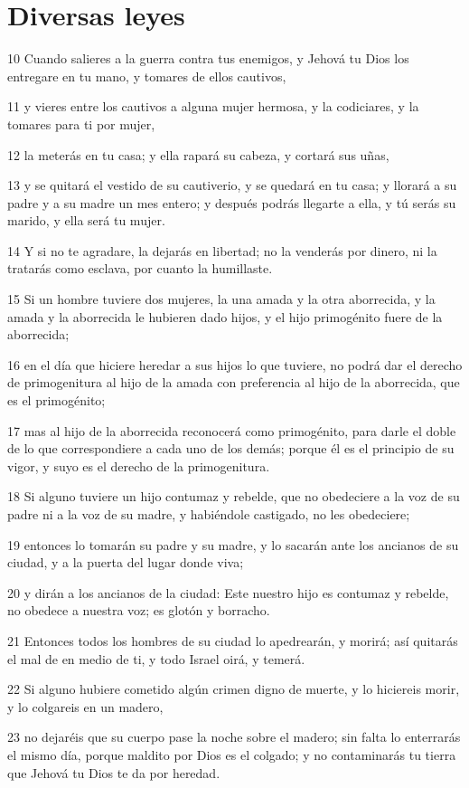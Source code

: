 \section{Diversas leyes}

\par 10 Cuando salieres a la guerra contra tus enemigos, y Jehová tu Dios los entregare en tu mano, y tomares de ellos cautivos,
\par 11 y vieres entre los cautivos a alguna mujer hermosa, y la codiciares, y la tomares para ti por mujer,
\par 12 la meterás en tu casa; y ella rapará su cabeza, y cortará sus uñas,
\par 13 y se quitará el vestido de su cautiverio, y se quedará en tu casa; y llorará a su padre y a su madre un mes entero; y después podrás llegarte a ella, y tú serás su marido, y ella será tu mujer.
\par 14 Y si no te agradare, la dejarás en libertad; no la venderás por dinero, ni la tratarás como esclava, por cuanto la humillaste.
\par 15 Si un hombre tuviere dos mujeres, la una amada y la otra aborrecida, y la amada y la aborrecida le hubieren dado hijos, y el hijo primogénito fuere de la aborrecida;
\par 16 en el día que hiciere heredar a sus hijos lo que tuviere, no podrá dar el derecho de primogenitura al hijo de la amada con preferencia al hijo de la aborrecida, que es el primogénito;
\par 17 mas al hijo de la aborrecida reconocerá como primogénito, para darle el doble de lo que correspondiere a cada uno de los demás; porque él es el principio de su vigor, y suyo es el derecho de la primogenitura.
\par 18 Si alguno tuviere un hijo contumaz y rebelde, que no obedeciere a la voz de su padre ni a la voz de su madre, y habiéndole castigado, no les obedeciere;
\par 19 entonces lo tomarán su padre y su madre, y lo sacarán ante los ancianos de su ciudad, y a la puerta del lugar donde viva;
\par 20 y dirán a los ancianos de la ciudad: Este nuestro hijo es contumaz y rebelde, no obedece a nuestra voz; es glotón y borracho.
\par 21 Entonces todos los hombres de su ciudad lo apedrearán, y morirá; así quitarás el mal de en medio de ti, y todo Israel oirá, y temerá.
\par 22 Si alguno hubiere cometido algún crimen digno de muerte, y lo hiciereis morir, y lo colgareis en un madero,
\par 23 no dejaréis que su cuerpo pase la noche sobre el madero; sin falta lo enterrarás el mismo día, porque maldito por Dios es el colgado; y no contaminarás tu tierra que Jehová tu Dios te da por heredad.

